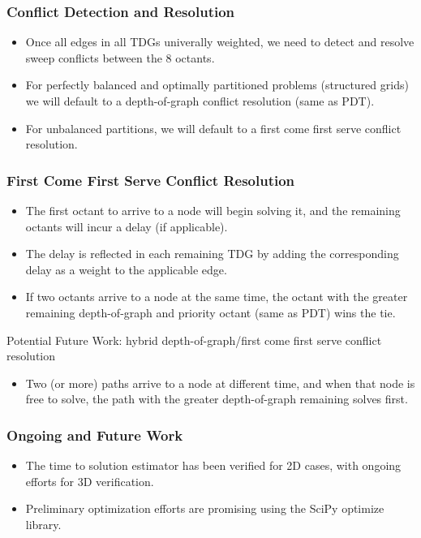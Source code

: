 \documentclass[xcolor={usenames,dvipsnames,svgnames,table}]{beamer}
\begin{document}
\begin{frame}[t]\frametitle{Conflict Detection and Resolution}
\begin{block}{}
\begin{itemize}
	\item Once all edges in all TDGs univerally weighted, we need to detect and resolve sweep conflicts between the 8 octants.
	\item For perfectly balanced and optimally partitioned problems (structured grids) we will default to a depth-of-graph conflict resolution (same as PDT).
	\item For unbalanced partitions, we will default to a first come first serve conflict resolution.
\end{itemize}
\end{block}
\end{frame}

\begin{frame}[t]\frametitle{First Come First Serve Conflict Resolution}
\begin{block}{}
\begin{itemize}
	\item The first octant to arrive to a node will begin solving it, and the remaining octants will incur a delay (if applicable).
	\item The delay is reflected in each remaining TDG by adding the corresponding delay as a weight to the applicable edge.
  \item If two octants arrive to a node at the same time, the octant with the greater remaining depth-of-graph and priority octant (same as PDT) wins the tie.
\end{itemize}
\end{block}
\begin{block}{Potential Future Work: hybrid depth-of-graph/first come first serve conflict resolution}
\begin{itemize}
	\item Two (or more) paths arrive to a node at different time, and when that node is free to solve, the path with the greater depth-of-graph remaining solves first.
\end{itemize}
\end{block}
\end{frame}

\begin{frame}[t]\frametitle{Ongoing and Future Work}
  \begin{block}{}
    \begin{itemize}
      \item The time to solution estimator has been verified for 2D cases, with ongoing efforts for 3D verification.
      \item Preliminary optimization efforts are promising using the SciPy optimize library.  
    \end{itemize}
  \end{block}
\end{frame}
\end{document}
